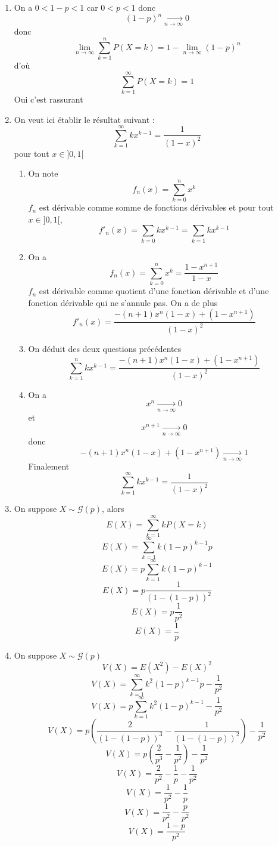 \begin{enumerate}
Ainsi 
$$\sum_{k=1}^n P(X=k) = p\sum_{k=1}^n (1-p)^{k-1} = p\frac{1-(1-p)^n}{p}$$
Finalement 
$$\boxed{\sum_{k=1}^n P(X=k) = 1 - (1-p)^n}$$
\item On a $0 < 1-p < 1$ car $0<p<1$ donc $$(1-p)^n \underset{n\rightarrow \infty}{\longrightarrow} 0$$ donc $$\underset{n\rightarrow \infty}{\lim} \sum_{k=1}^n P(X=k) = 1 - \underset{n\rightarrow \infty}{\lim} (1-p)^n$$ d'où $$\boxed{\sum_{k=1}^\infty P(X=k)=1}$$ Oui c'est rassurant
\item On veut ici établir le résultat suivant : 
$$\boxed{\sum_{k=1}^\infty kx^{k-1} = \frac{1}{(1-x)^2}}$$ pour tout $x\in ]0,1[$
\begin{enumerate}
\item On note $$f_n(x) = \sum_{k=0}^n x^k$$ $f_n$ est dérivable comme somme de fonctions dérivables et pour tout $x\in ]0,1[$, $$\boxed{f'_n(x) = \sum_{k=0} kx^{k-1} = \sum_{k=1} kx^{k-1}}$$ 
\item On a $$f_n(x) = \sum_{k=0}^n x^k = \frac{1-x^{n+1}}{1-x}$$ $f_n$ est dérivable comme quotient d'une fonction dérivable et d'une fonction dérivable qui ne s'annule pas. On a de plus 
$$\boxed{f'_n(x) = \frac{-(n+1)x^n(1-x) +(1-x^{n+1})}{(1-x)^2}}$$
\item On déduit des deux questions précédentes
$$\boxed{\sum_{k=1}^n kx^{k-1} = \frac{-(n+1)x^n(1-x) +(1-x^{n+1})}{(1-x)^2}}$$
\item On a $$x^n \underset{n\rightarrow \infty}{\longrightarrow} 0$$ et $$x^{n+1} \underset{n\rightarrow \infty}{\longrightarrow} 0$$ donc $$-(n+1)x^n(1-x) +(1-x^{n+1}) \underset{n\rightarrow \infty}{\longrightarrow} 1$$
Finalement
$$\boxed{\sum_{k=1}^\infty kx^{k-1} = \frac{1}{(1-x)^2}}$$
\end{enumerate}
\item On suppose $X\sim \mathcal{G}(p)$, alors 
$$E(X) = \sum_{k=1}^\infty kP(X=k)$$
$$E(X) = \sum_{k=1}^\infty k(1-p)^{k-1}p$$
$$E(X) = p\sum_{k=1}^\infty k(1-p)^{k-1}$$
$$E(X) = p\frac{1}{(1-(1-p))^2}$$
$$E(X) = p\frac{1}{p^2}$$
$$\boxed{E(X) = \frac{1}{p}}$$
\item On suppose $X\sim \mathcal{G}(p)$
$$V(X) = E(X^2)-E(X)^2$$
$$V(X) = \sum_{k=1}^\infty k^2 (1-p)^{k-1}p - \frac{1}{p^2}$$
$$V(X) = p\sum_{k=1}^\infty k^2 (1-p)^{k-1} - \frac{1}{p^2}$$
$$V(X) = p\left( \frac{2}{(1-(1-p))^3}-\frac{1}{(1-(1-p))^2}\right) - \frac{1}{p^2}$$
$$V(X) = p\left( \frac{2}{p^3}-\frac{1}{p^2}\right) - \frac{1}{p^2}$$
$$V(X) = \frac{2}{p^2}-\frac{1}{p} - \frac{1}{p^2}$$
$$V(X) = \frac{1}{p^2}-\frac{1}{p}$$
$$V(X) = \frac{1}{p^2}-\frac{p}{p^2}$$
$$\boxed{V(X) = \frac{1-p}{p^2}}$$

\end{enumerate}
